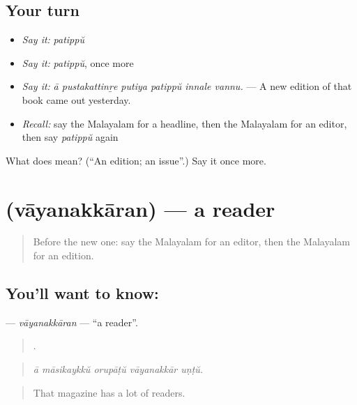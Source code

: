 \subsection*{Your turn}
\begin{itemize}
\raggedright
  \item \emph{Say it:} \emph{patippŭ}
  \item \emph{Say it:} \emph{patippŭ}, once more
  \item \emph{Say it:} \emph{ā pustakattinṟe putiya patippŭ innale vannu.} — A new edition of that book came out yesterday.
  \item \emph{Recall:} say the Malayalam for a headline, then the Malayalam for an editor, then say \emph{patippŭ} again
\end{itemize}

\begin{tcolorbox}[breakable,colback=teal!4,colframe=teal!35!black,title={Before you move on}]
What does  mean? (\textquotedblleft{}An edition; an issue\textquotedblright{}.) Say it once more.
\end{tcolorbox}
\section[\texorpdfstring{\ml{വായനക്കാരൻ} (vāyanakkāran)}{വായനക്കാരൻ (vāyanakkāran)}]{ (vāyanakkāran) — a reader}

\label{lesson:ML-C350-vayanakkaran}



\begin{quote}
Before the new one: say the Malayalam for an editor, then the Malayalam for an edition.
\end{quote}

\subsection*{You'll want to know: }
\textbf{} — \emph{vāyanakkāran} — \textquotedblleft{}a reader\textquotedblright{}.

\begin{quote}
    .
\end{quote}

\begin{quote}
\emph{ā māsikaykkŭ orupāṭŭ vāyanakkār uṇṭŭ.}
\end{quote}

\begin{quote}
That magazine has a lot of readers.
\end{quote}

